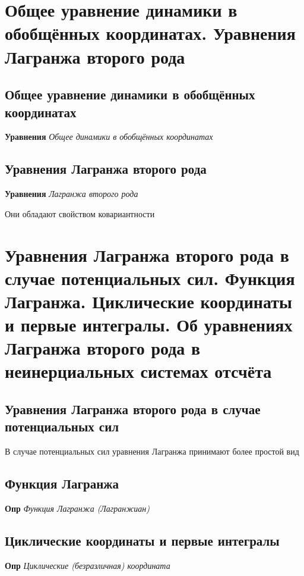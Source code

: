 \documentclass[a4paper, 14pt]{article}
\begin{document}
    \section{Общее уравнение динамики в обобщённых координатах.
    Уравнения Лагранжа второго рода}
    
    \subsection{Общее уравнение динамики в обобщённых координатах}
    
    \textbf{Уравнения} \textit{Общее динамики в обобщённых координатах}
    
    \subsection{Уравнения Лагранжа второго рода}
    
    \textbf{Уравнения} \textit{Лагранжа второго рода}
    
    Они обладают свойством ковариантности
    
    \section{Уравнения Лагранжа второго рода в случае потенциальных сил.
    Функция Лагранжа.
    Циклические координаты и первые интегралы.
    Об уравнениях Лагранжа второго рода в неинерциальных системах отсчёта}
    
    \subsection{Уравнения Лагранжа второго рода в случае потенциальных сил}
    
    В случае потенциальных сил уравнения Лагранжа принимают более простой вид
    
    \subsection{Функция Лагранжа}
    
    \textbf{Опр} \textit{Функция Лагранжа (Лагранжиан)}
    
    \subsection{Циклические координаты и первые интегралы}
    
    \textbf{Опр} \textit{Циклические (безразличная) координата}
    
\end{document}
